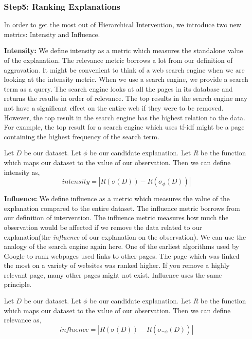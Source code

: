 \subsubsection{Step5: Ranking Explanations}
\label{sec:extending_hi}

In order to get the most out of Hierarchical Intervention, we introduce two new metrics: Intensity and Influence.

\textbf{Intensity:}
\label{sec:intensity}
We define intensity as a metric which measures the standalone value of the explanation. The relevance metric borrows a lot from our definition of aggravation. It might be convenient to think of a web search engine when we are looking at the intensity metric. When we use a search engine, we provide a search term as a query. The search engine looks at all the pages in its database and returns the results in order of relevance. The top results in the search engine may not have a significant effect on the entire web if they were to be removed. However, the top result in the search engine has the highest relation to the data. For example, the top result for a search engine which uses tf-idf might be a page containing the highest frequency of the search term\cite{robertson2004understanding}.

Let $D$ be our dataset. Let $\phi$ be our candidate explanation. Let $R$ be the function which maps our dataset to the value of our observation. Then we can define intensity as,
$$intensity = |R(\sigma (D)) - R(\sigma_\phi (D))|$$

\textbf{Influence:}
\label{sec:influence}
We define influence as a metric which measures the value of the explanation compared to the entire dataset. The influence metric borrows from our definition of intervention. The influence metric measures how much the observation would be affected if we remove the data related to our explanation(the \textit{influence} of our explanation on the observation). We can use the analogy of the search engine again here. One of the earliest algorithms used by Google to rank webpages used links to other pages\cite{brin1998anatomy}. The page which was linked the most on a variety of websites was ranked higher. If you remove a highly relevant page, many other pages might not exist. Influence uses the same principle.

Let $D$ be our dataset. Let $\phi$ be our candidate explanation. Let $R$ be the function which maps our dataset to the value of our observation. Then we can define relevance as,
$$influence = |R(\sigma(D)) - R(\sigma_{\neg \phi} (D)) |$$

